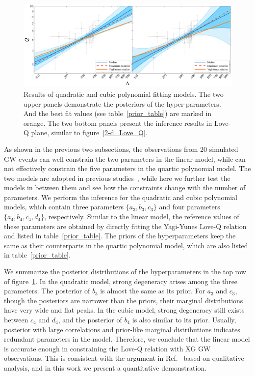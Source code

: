 \documentclass[a4paper,11pt]{article}
\begin{document}
\begin{figure}
    \begin{minipage}[t]{\textwidth}
    \includegraphics[width=\linewidth]{hierarchical_results_AP4_3d.pdf}%
    \end{minipage}
    \caption{\label{3-d_4-d_Love_Q} Results of quadratic and cubic polynomial fitting models. The 
    two upper panels demonstrate the posteriors of the hyper-parameters. And the best fit values (see table~\ref{prior_table}) 
    are marked in orange. The two bottom panels present the inference results in Love-Q plane, similar to 
    figure~\ref{2-d_Love_Q}.
    }
\end{figure}
As shown in the previous two subsections, the observations from 20 simulated GW
events can well constrain the two parameters in the linear model, while can not
effectively constrain the five parameters in the quartic polynomial model. The
two models are adopted in previous
studies~\cite{Yagi:2013awa, Samajdar:2020xrd}, while here we further test the models in between them and see how the
constraints change with the number of parameters. We perform the inference for
the quadratic and cubic polynomial models, which contain three parameters 
$\{a_3, b_3, c_3\}$
and four parameters $\{a_4, b_4, c_4, d_4\}$, respectively. Similar to the linear model, the reference values of
these parameters are obtained by directly fitting the Yagi-Yunes
Love-Q relation and listed in table~\ref{prior_table}. The priors of the
hyperparameters keep the same as their counterparts in the quartic polynomial
model, which are also listed in table~\ref{prior_table}.

We summarize the posterior distributions of the hyperparameters in the top row of figure~\ref{3-d_4-d_Love_Q}. In the quadratic model, strong
degeneracy arises among the three parameters. 
The posterior of $b_3$ is almost the same as its prior. For $a_3$ and $c_3$,
though the posteriors are narrower than the priors, their marginal distributions
have very wide and flat peaks. In the cubic model, strong degeneracy still exists
between $c_4$ and $d_4$, and the posterior of $b_4$ is also similar to its
prior. Usually, posterior with large correlations and prior-like marginal
distributions indicates redundant parameters in the model. Therefore, we
conclude that the linear model is accurate enough in constraining the Love-Q
relation with XG GW observations. This is consistent with the argument in
Ref.~\cite{Samajdar:2020xrd} based on qualitative analysis, and in this work we
present a quantitative demonstration. 
\end{document}
